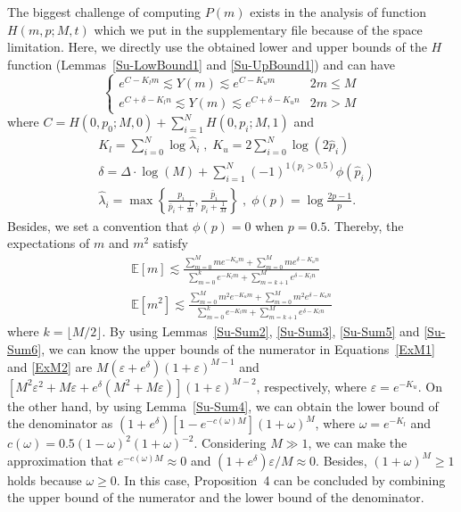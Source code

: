 \documentclass{article}
\begin{document}
The biggest challenge of computing $P(m)$ exists in the analysis of function $H(m,p;M,t)$ which we put in the supplementary file because of the space limitation. 
Here, we directly use the obtained lower and upper bounds of the $H$ function (Lemmas~\ref{Su-LowBound1} and \ref{Su-UpBound1}) and can have
\begin{equation}
\left\{
\begin{array}{lc}
e^{C-{K}_l m}\lesssim Y(m) \lesssim e^{C-K_u m} & 2m\leq M\\
e^{C+\delta-{K}_l  n}\lesssim Y(m) \lesssim e^{C+\delta-K_u n} & 2m>M
\end{array}
\right.
\end{equation}
where $C=H(0,p_0;M,0)+\sum_{i=1}^{N}H(0,p_i;M,1)$ and
\begin{equation*}
\begin{split}
&K_l = {\sum}_{i=0}^{N}\log \hat{\lambda}_{i}\;,\; K_u =  2{\sum}_{i=0}^{N}\log \left(2\hat{p}_i\right)\\
&\delta = \Delta\cdot \log(M)+{\sum}_{i=1}^{N}(-1)^{1(p_i>0.5)}\phi(\hat{p}_i)\\
&\hat{\lambda}_i=\max\left\{\frac{p_i}{\bar{p}_i+\frac{1}{M}},\frac{\bar{p}_i}{p_i+\frac{1}{M}}\right\}
\;,\;\phi (p) =\log\frac{2p-1}{p}.
\end{split}
\end{equation*}
Besides, we set a convention that $\phi(p)=0$ when $p=0.5$. Thereby, the expectations of $m$ and $m^2$ satisfy
\begin{align}
\mathbb{E}[m] \lesssim \frac{\sum_{m=0}^{M}me^{-K_u m}+\sum_{m=0}^{M}me^{\delta-K_u n}}{\sum_{m=0}^{k}e^{-K_l m}+\sum_{m=k+1}^{M}e^{\delta-K_l n}}
\label{ExM1}\\
\mathbb{E}[m^2] \lesssim \frac{\sum_{m=0}^{M}m^2e^{-K_u m}+\sum_{m=0}^{M}m^2e^{\delta-K_u n}}{\sum_{m=0}^{k}e^{-K_l m}+\sum_{m=k+1}^{M}e^{\delta-K_l n}} \label{ExM2}
\end{align}
where $k=\lfloor M/2 \rfloor$.
By using Lemmas~\ref{Su-Sum2}, \ref{Su-Sum3}, \ref{Su-Sum5} and \ref{Su-Sum6}, we can know the upper bounds of the numerator in Equations~\ref{ExM1} and \ref{ExM2} are $M(\varepsilon+e^{\delta})(1+\varepsilon)^{M-1}$ and $[M^2\varepsilon^2+M\varepsilon+e^{\delta}(M^2+M\varepsilon)](1+\varepsilon)^{M-2}$, respectively, where $\varepsilon=e^{-K_u}$. On the other hand, by using Lemma~\ref{Su-Sum4}, we can obtain the lower bound of the denominator as $(1+e^{\delta})[1-e^{-c(\omega)M}](1+\omega)^{M}$, where $\omega=e^{-K_l}$ and $c(\omega)=0.5(1-\omega)^2(1+\omega)^{-2}$.
Considering $M\gg 1$, we can make the approximation that $e^{-c(\omega)M}\approx 0$ and $(1+e^\delta)\varepsilon/M\approx 0$. Besides, $(1+\omega)^{M}\geq 1$ holds because $\omega\geq 0$. In this case, Proposition~4 can be concluded by combining the upper bound of the numerator and the lower bound of the denominator.
\end{document}
